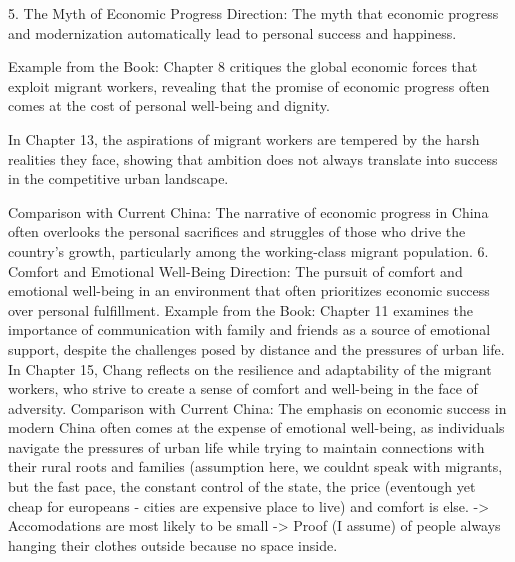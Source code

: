 5. The Myth of Economic Progress
Direction: The myth that economic progress and modernization automatically lead to personal success and happiness.

Example from the Book:
Chapter 8 critiques the global economic forces that exploit migrant workers, revealing that the promise of economic progress often comes at the cost of personal well-being and dignity.

In Chapter 13, the aspirations of migrant workers are tempered by the harsh realities they face, showing that ambition does not always translate into success in the competitive urban landscape.

Comparison with Current China:
The narrative of economic progress in China often overlooks the personal sacrifices and struggles of those who drive the country’s growth, particularly among the working-class migrant population.
6. Comfort and Emotional Well-Being
Direction: The pursuit of comfort and emotional well-being in an environment that often prioritizes economic success over personal fulfillment.
Example from the Book:
Chapter 11 examines the importance of communication with family and friends as a source of emotional support, despite the challenges posed by distance and the pressures of urban life.
In Chapter 15, Chang reflects on the resilience and adaptability of the migrant workers, who strive to create a sense of comfort and well-being in the face of adversity.
Comparison with Current China:
The emphasis on economic success in modern China often comes at the expense of emotional well-being, as individuals navigate the pressures of urban life while trying to maintain connections with their rural roots and families (assumption here, we couldnt speak with migrants, but the fast pace, the constant control of the state, the price (eventough yet cheap for europeans - cities are expensive place to live) and comfort is else. -> Accomodations are most likely to be small -> Proof (I assume) of people always hanging their clothes outside because no space inside. 




